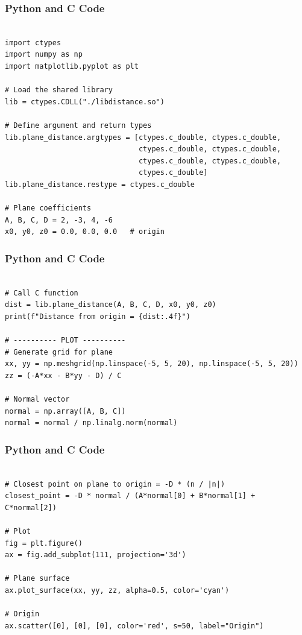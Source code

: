 \documentclass{beamer}
\begin{document}
\begin{frame}[fragile]
\frametitle{Python and C Code}

\begin{lstlisting}

import ctypes
import numpy as np
import matplotlib.pyplot as plt

# Load the shared library
lib = ctypes.CDLL("./libdistance.so")

# Define argument and return types
lib.plane_distance.argtypes = [ctypes.c_double, ctypes.c_double,
                               ctypes.c_double, ctypes.c_double,
                               ctypes.c_double, ctypes.c_double,
                               ctypes.c_double]
lib.plane_distance.restype = ctypes.c_double

# Plane coefficients
A, B, C, D = 2, -3, 4, -6
x0, y0, z0 = 0.0, 0.0, 0.0   # origin
\end{lstlisting}

\end{frame}


\begin{frame}[fragile]
\frametitle{Python and C Code}

\begin{lstlisting}

# Call C function
dist = lib.plane_distance(A, B, C, D, x0, y0, z0)
print(f"Distance from origin = {dist:.4f}")

# ---------- PLOT ----------
# Generate grid for plane
xx, yy = np.meshgrid(np.linspace(-5, 5, 20), np.linspace(-5, 5, 20))
zz = (-A*xx - B*yy - D) / C

# Normal vector
normal = np.array([A, B, C])
normal = normal / np.linalg.norm(normal)
\end{lstlisting}

\end{frame}


\begin{frame}[fragile]
\frametitle{Python and C Code}

\begin{lstlisting}

# Closest point on plane to origin = -D * (n / |n|)
closest_point = -D * normal / (A*normal[0] + B*normal[1] + C*normal[2])

# Plot
fig = plt.figure()
ax = fig.add_subplot(111, projection='3d')

# Plane surface
ax.plot_surface(xx, yy, zz, alpha=0.5, color='cyan')

# Origin
ax.scatter([0], [0], [0], color='red', s=50, label="Origin")
\end{lstlisting}

\end{frame}
\end{document}
